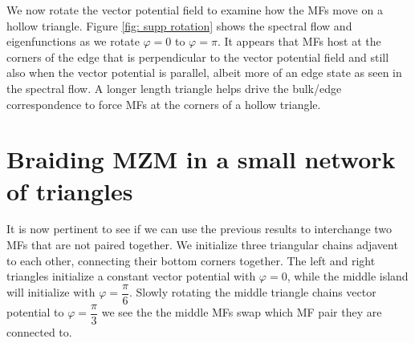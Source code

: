 \documentclass[aps,prb,showpacs,amsmath,amssymb,superscriptaddress]{revtex4-2}
\begin{document}
We now rotate the vector potential field to examine how the MFs move on a hollow triangle.
Figure \ref{fig: supp rotation} shows the spectral flow and eigenfunctions as we rotate $\varphi=0$ to $\varphi=\pi$.
It appears that MFs host at the corners of the edge that is perpendicular to the vector potential field and still also when the vector potential is parallel, albeit more of an edge state as seen in the spectral flow.
A longer length triangle helps drive the bulk/edge correspondence to force MFs at the corners of a hollow triangle.


\section{Braiding MZM in a small network of triangles}

It is now pertinent to see if we can use the previous results to interchange two MFs that are not paired together.
We initialize three triangular chains adjavent to each other, connecting their bottom corners together.
The left and right triangles initialize a constant vector potential with $\varphi=0$, while the middle island will initialize with $\varphi=\dfrac{\pi}{6}$.
Slowly rotating the middle triangle chains vector potential to $\varphi=\dfrac{\pi}{3}$ we see the the middle MFs swap which MF pair they are connected to.
\end{document}
